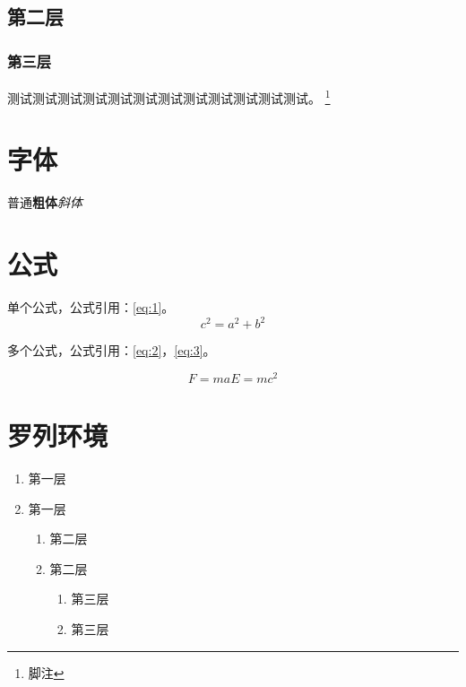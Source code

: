 \documentclass[format=draft,language=chinese,degree=master]{hustthesis}
\begin{document}
\subsection{第二层}\label{sec:1}
\subsubsection{第三层}\label{sec:1}
测试测试测试测试测试测试测试测试测试测试测试测试。
\footnote{\label{footnote:1}脚注}

\section{字体}

普通\textbf{粗体}\emph{斜体}


\section{公式}

单个公式，公式引用：\autoref{eq:1}。
\begin{equation}
 c^2 = a^2 + b^2 \label{eq:1}
\end{equation}

多个公式，公式引用：\autoref{eq:2}，\autoref{eq:3}。

\begin{subequations}
\begin{equation}
  F = ma \label{eq:2}
\end{equation}
\begin{equation}
  E = mc^2 \label{eq:3}
\end{equation}
\end{subequations}

\section{罗列环境}

\begin{enumerate}
    \item 第一层\label{item:1}
    \item 第一层
    \begin{enumerate}
        \item 第二层\label{item:2}
        \item 第二层
        \begin{enumerate}
            \item 第三层\label{item:3}
            \item 第三层
        \end{enumerate}
    \end{enumerate}
\end{enumerate}
\end{document}

